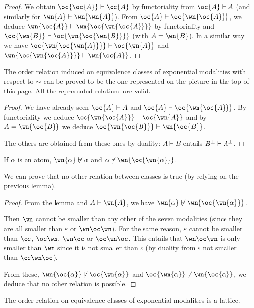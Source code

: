 \begin{proof}
We obtain $\oc{\oc{A}}\vdash\oc{A}$ by functoriality from $\oc{A}\vdash A$ (and similarly for $\wn{A}\vdash\wn{\wn{A}}$).
From $\oc{A}\vdash \oc{\wn{\oc{A}}}$, we deduce $\wn{\oc{A}}\vdash \wn{\oc{\wn{\oc{A}}}}$ by functoriality and $\oc{\wn{B}}\vdash \oc{\wn{\oc{\wn{B}}}}$ (with $A=\wn{B}$). In a similar way we have $\oc{\wn{\oc{\wn{A}}}}\vdash \oc{\wn{A}}$ and $\wn{\oc{\wn{\oc{A}}}}\vdash \wn{\oc{A}}$.
\end{proof}

The order relation induced on equivalence classes of exponential
modalities with respect to \(\sim\) can be proved to be the one
represented on the picture in the top of this page. All the represented
relations are valid.

\begin{proof}
We have already seen $\oc{A}\vdash A$ and $\oc{A}\vdash \oc{\wn{\oc{A}}}$. By functoriality we deduce $\oc{\wn{\oc{A}}}\vdash \oc{\wn{A}}$ and by $A=\wn{\oc{B}}$ we deduce $\oc{\wn{\oc{B}}}\vdash \wn{\oc{B}}$.

The others are obtained from these ones by duality: $A\vdash B$ entails $B^\bot\vdash A^\bot$.
\end{proof}

\begin{lemma}
If $\alpha$ is an atom, $\wn{\alpha}\not\vdash\alpha$ and 
$\alpha\not\vdash\wn{\oc{\wn{\alpha}}}$.
\end{lemma}

We can prove that no other relation between classes is true (by relying
on the previous lemma).

\begin{proof}
From the lemma and $A\vdash\wn{A}$, we have $\wn{\alpha}\not\vdash\wn{\oc{\wn{\alpha}}}$.

Then $\wn$ cannot be smaller than any other of the seven modalities (since they are all smaller than $\varepsilon$ or $\wn\oc\wn$). For the same reason, $\varepsilon$ cannot be smaller than $\oc$, $\oc\wn$, $\wn\oc$ or $\oc\wn\oc$. This entails that $\wn\oc\wn$ is only smaller than $\wn$ since it is not smaller than $\varepsilon$ (by duality from $\varepsilon$ not smaller than $\oc\wn\oc$).

From these, $\wn{\oc{\alpha}}\not\vdash\oc{\wn{\alpha}}$ and $\oc{\wn{\alpha}}\not\vdash\wn{\oc{\alpha}}$, we deduce that no other relation is possible.
\end{proof}

The order relation on equivalence classes of exponential modalities is a
lattice.


